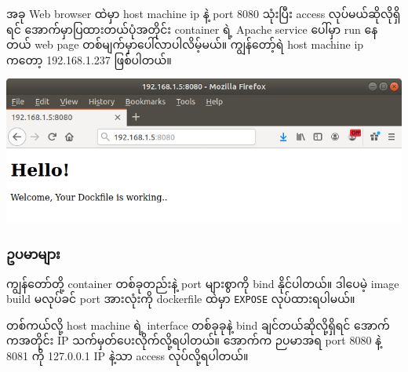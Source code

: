 အခု Web browser ထဲမှာ host machine ip နဲ့ port 8080 သုံးပြီး access
လုပ်မယ်ဆိုလိုရှိရင် အောက်မှာပြထားတယ်ပုံအတိုင်း container ရဲ့ Apache
service ပေါ်မှာ run နေတယ် web page တစ်မျက်မှာပေါ်လာပါလိမ့်မယ်။
ကျွန်တော့်ရဲ host machine ip ကတော့ 192.168.1.237 ဖြစ်ပါတယ်။

\includegraphics{.gitbook/assets/docker_file_and_docker_port.png}

\hypertarget{ux1025ux1015ux1019ux102cux1019ux103bux102cux1038-1}{%
\subsubsection{ဥပမာများ}\label{ux1025ux1015ux1019ux102cux1019ux103bux102cux1038-1}}

ကျွန်တော်တို့ container တစ်ခုတည်းနဲ့ port များစွာကို bind နိုင်ပါတယ်။
ဒါပေမဲ့ image build မလုပ်ခင် port အားလုံးကို dockerfile ထဲမှာ
\texttt{EXPOSE} လုပ်ထားရပါမယ်။

\begin{Shaded}
\begin{Highlighting}[]
\NormalTok{$ }
\end{Highlighting}
\end{Shaded}

တစ်ကယ်လို့ host machine ရဲ့ interface တစ်ခုခုနဲ့ bind
ချင်တယ်ဆိုလို့ရှိရင် အောက်ကအတိုင်း IP သက်မှတ်ပေးလိုက်လို့ရပါတယ်။ အောက်က
ဉပမာအရ port 8080 နဲ့ 8081 ကို 127.0.0.1 IP နဲ့သာ access လုပ်လို့ရပါတယ်။

\begin{Shaded}
\begin{Highlighting}[]
\NormalTok{$ }
\NormalTok{$ }
\end{Highlighting}
\end{Shaded}

\pagebreak


